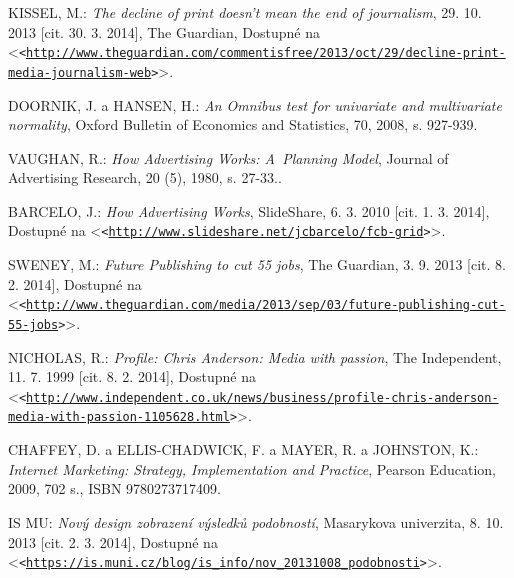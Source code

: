 \documentclass[12pt,twoside,openany]{fithesis}
\let\origurl\url
\def\url#1{\texttt{<\origurl{#1}>}}
\begin{document}
\begin{thebibliography}{99}

KISSEL, M.: \emph{The decline of print doesn't mean the end of journalism}, 29. 10. 2013 [cit. 30. 3. 2014], The Guardian, Dostupné na {\textless}\url{http://www.theguardian.com/commentisfree/2013/oct/29/decline-print-media-journalism-web}{\textgreater}. 


DOORNIK, J. a HANSEN, H.: \emph{An Omnibus test for univariate and multivariate normality}, Oxford Bulletin of Economics and Statistics,
        70, 2008, s. 927-939. 


VAUGHAN, R.: \emph{How Advertising Works: A~Planning Model}, Journal of Advertising Research, 20 (5), 1980, s. 27-33.. 


BARCELO, J.: \emph{How Advertising Works}, SlideShare, 6. 3. 2010 [cit. 1. 3. 2014], Dostupné na {\textless}\url{http://www.slideshare.net/jcbarcelo/fcb-grid}{\textgreater}. 


SWENEY, M.: \emph{Future Publishing to cut 55 jobs}, The Guardian, 3. 9. 2013 [cit. 8. 2. 2014], Dostupné na {\textless}\url{http://www.theguardian.com/media/2013/sep/03/future-publishing-cut-55-jobs}{\textgreater}. 


NICHOLAS, R.: \emph{Profile: Chris Anderson: Media with passion}, The Independent, 11. 7. 1999 [cit. 8. 2. 2014], Dostupné na {\textless}\url{http://www.independent.co.uk/news/business/profile-chris-anderson-media-with-passion-1105628.html}{\textgreater}. 


CHAFFEY, D. a ELLIS-CHADWICK, F. a MAYER, R. a JOHNSTON, K.: \emph{Internet Marketing: Strategy, Implementation and Practice}, Pearson Education, 2009, 702 s., ISBN 9780273717409. 


IS MU: \emph{Nový design zobrazení výsledků podobností}, Masarykova univerzita, 8. 10. 2013 [cit. 2. 3. 2014], Dostupné na {\textless}\url{https://is.muni.cz/blog/is_info/nov_20131008_podobnosti}{\textgreater}. 


\end{thebibliography}
\end{document}
